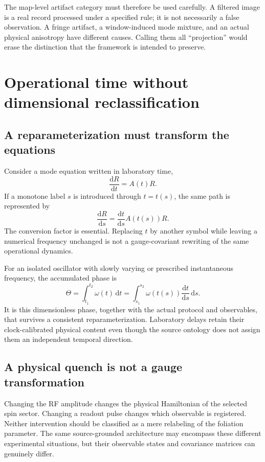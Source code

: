 \documentclass[11pt,a4paper]{article}
\theoremstyle{definition}
\theoremstyle{remark}
\newcommand{\dd}{\mathrm{d}}
\begin{document}
The map-level artifact category must therefore be used carefully. A filtered image is a real record processed under a specified rule; it is not necessarily a false observation. A fringe artifact, a window-induced mode mixture, and an actual physical anisotropy have different causes. Calling them all ``projection'' would erase the distinction that the framework is intended to preserve.\cite{foundation,zhang2026}

\section{Operational time without dimensional reclassification}
\label{sec:time}
\subsection{A reparameterization must transform the equations}
Consider a mode equation written in laboratory time,
\begin{equation}
 \frac{\dd R}{\dd t}=A(t)R.
 \label{eq:lab_dynamics}
\end{equation}
If a monotone label $s$ is introduced through $t=t(s)$, the same path is represented by
\begin{equation}
 \frac{\dd R}{\dd s}=\frac{\dd t}{\dd s}A(t(s))R.
 \label{eq:reparameterized}
\end{equation}
The conversion factor is essential. Replacing $t$ by another symbol while leaving a numerical frequency unchanged is not a gauge-covariant rewriting of the same operational dynamics.

For an isolated oscillator with slowly varying or prescribed instantaneous frequency, the accumulated phase is
\begin{equation}
 \Theta=\int_{t_1}^{t_2}\omega(t)\,\dd t
 =\int_{s_1}^{s_2}\omega(t(s))\frac{\dd t}{\dd s}\,\dd s.
 \label{eq:phase_invariant}
\end{equation}
It is this dimensionless phase, together with the actual protocol and observables, that survives a consistent reparameterization. Laboratory delays retain their clock-calibrated physical content even though the source ontology does not assign them an independent temporal direction.\cite{foundation,minkowski}

\subsection{A physical quench is not a gauge transformation}
Changing the RF amplitude changes the physical Hamiltonian of the selected spin sector. Changing a readout pulse changes which observable is registered. Neither intervention should be classified as a mere relabeling of the foliation parameter. The same source-grounded architecture may encompass these different experimental situations, but their observable states and covariance matrices can genuinely differ.\cite{zhang2026,foundation}
\end{document}
